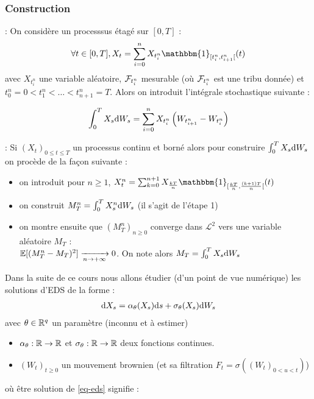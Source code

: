 \subsubsection{Construction}
 : On considère un processsus étagé sur $[0,T]$ :
\[ \forall t \in [0, T], X_t = \sum_{i=0}^{n} X_{t_i^n} \mathbbm{1}_{[t_i^n, t_{i+1}^n[}(t) \]
avec $X_{t_i^n}$ une variable aléatoire, $\mathcal{F}_{t_i^n}$ mesurable (où $\mathcal{F}_{t_i^n}$ est une tribu donnée) et $t_0^n = 0 < t_1^n < \ldots < t_{n+1}^n = T$. Alors on introduit l'intégrale stochastique suivante :

\[ \int_{0}^{T} X_s \mathrm{d} W_s = \sum_{i=0}^{n} X_{t_i^n} \left(W_{t_{i+1}^n} - W_{t_i^n} \right) \]

 : Si $(X_t)_{0\leq t \leq T}$ un processus continu et borné alors pour construire $ \int_{0}^{T} X_s \mathrm{d} W_s$ on procède de la façon suivante :
\begin{itemize}
  \item on introduit pour $n \geq 1$, $X_t^n = \sum_{k=0}^{n+1} X_{ \frac{kT}{n}} \mathbbm{1}_{[ \frac{kT}{n}, \frac{(k+1)T}{n} [}(t)$
  \item on construit $M_T^n = \int_{0}^{T} X_s^n \mathrm{d} W_s$ (il s'agit de l'étape 1)
    \item on montre ensuite que $(M_T^n)_{n\geq 0}$ converge dans $\mathcal{L}^2$ vers une variable aléatoire $M_T$ : \\
      $\mathbb{E}[(M_T^n - M_T)^2] \xrightarrow[n\to +\infty]{} 0$. On note alors $M_T = \int_{0}^{T} X_s \mathrm{d} W_s$
\end{itemize}

\vspace{0.4cm}
Dans la suite de ce cours nous allons étudier (d'un point de vue numérique) les solutions d'EDS de la forme :
\begin{equation*}
  \label{eq-eds}
\begin{split}
\mathrm{d} X_s = \alpha_\theta (X_s) \mathrm{d} s + \sigma_\theta (X_s) \mathrm{d} W_s 
\end{split}
\end{equation*}
avec $\theta \in \mathbb{R}^q$ un paramètre (inconnu et à estimer)
\begin{itemize}
\item $\alpha_\theta : \mathbb{R} \to \mathbb{R}$ et $\sigma_\theta : \mathbb{R} \to \mathbb{R}$ deux fonctions continues.
\item $(W_t)_{t\geq 0}$ un mouvement brownien (et sa filtration $F_t = \sigma((W_t)_{0 < u < t})$)
\end{itemize}
où être solution de \eqref{eq-eds} signifie :

